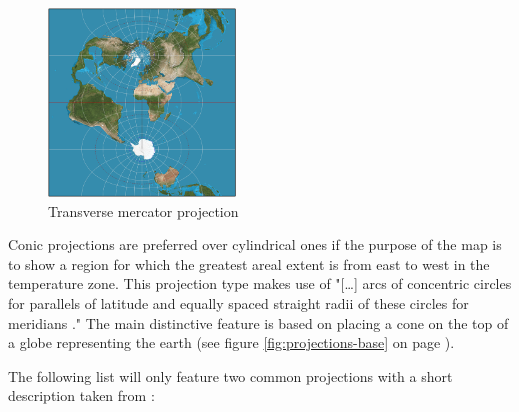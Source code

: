 \begin{enumerate}
\begin{figure}[!htb]
\centering
\includegraphics[height=5cm,keepaspectratio]{images/methods/projections/mercator-transverse.png}
\caption[
    Transverse mercator projection, Urldate: 07.2016 \newline
    \small\texttt{\url{https://upload.wikimedia.org/wikipedia/commons/1/15/MercTranSph.png}}.
]{Transverse mercator projection}
\label{fig:projections-mercator-transverse}
\end{figure}

\end{enumerate}

Conic projections are preferred over cylindrical ones if the purpose of the map is to show a region for which the greatest areal extent is from east to west in the temperature zone. This projection type makes use of "[\ldots] arcs of concentric circles for parallels of latitude and equally spaced straight radii of these circles for meridians ." The main distinctive feature is based on placing a cone on the top of a globe representing the earth (see figure \ref{fig:projections-base} on page \pageref{fig:projections-base}).

The following list will only feature two common projections with a short description taken from \citeauthor{Snyder1987} :

